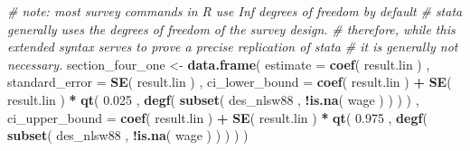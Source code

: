 \documentclass[]{book}
\newenvironment{Shaded}{\begin{snugshade}}{\end{snugshade}}
\newcommand{\CommentTok}[1]{\textcolor[rgb]{0.56,0.35,0.01}{\textit{#1}}}
\newcommand{\DataTypeTok}[1]{\textcolor[rgb]{0.13,0.29,0.53}{#1}}
\newcommand{\FloatTok}[1]{\textcolor[rgb]{0.00,0.00,0.81}{#1}}
\newcommand{\KeywordTok}[1]{\textcolor[rgb]{0.13,0.29,0.53}{\textbf{#1}}}
\newcommand{\NormalTok}[1]{#1}
\newcommand{\OperatorTok}[1]{\textcolor[rgb]{0.81,0.36,0.00}{\textbf{#1}}}
\newcommand{\StringTok}[1]{\textcolor[rgb]{0.31,0.60,0.02}{#1}}
\begin{document}
\begin{Shaded}
\begin{Highlighting}[]
\CommentTok{# note: most survey commands in R use Inf degrees of freedom by default}
\CommentTok{# stata generally uses the degrees of freedom of the survey design.}
\CommentTok{# therefore, while this extended syntax serves to prove a precise replication of stata}
\CommentTok{# it is generally not necessary.}
\NormalTok{section_four_one <-}
\StringTok{    }\KeywordTok{data.frame}\NormalTok{( }
        \DataTypeTok{estimate =} \KeywordTok{coef}\NormalTok{( result.lin ) , }
        \DataTypeTok{standard_error =} \KeywordTok{SE}\NormalTok{( result.lin ) , }
        \DataTypeTok{ci_lower_bound =} 
            \KeywordTok{coef}\NormalTok{( result.lin ) }\OperatorTok{+}\StringTok{ }
\StringTok{            }\KeywordTok{SE}\NormalTok{( result.lin ) }\OperatorTok{*}\StringTok{ }
\StringTok{            }\KeywordTok{qt}\NormalTok{( }\FloatTok{0.025}\NormalTok{ , }\KeywordTok{degf}\NormalTok{( }\KeywordTok{subset}\NormalTok{( des_nlsw88 , }\OperatorTok{!}\KeywordTok{is.na}\NormalTok{( wage ) ) ) ) ,}
        \DataTypeTok{ci_upper_bound =} 
            \KeywordTok{coef}\NormalTok{( result.lin ) }\OperatorTok{+}\StringTok{ }
\StringTok{            }\KeywordTok{SE}\NormalTok{( result.lin ) }\OperatorTok{*}\StringTok{ }
\StringTok{            }\KeywordTok{qt}\NormalTok{( }\FloatTok{0.975}\NormalTok{ , }\KeywordTok{degf}\NormalTok{( }\KeywordTok{subset}\NormalTok{( des_nlsw88 , }\OperatorTok{!}\KeywordTok{is.na}\NormalTok{( wage ) ) ) )}
\NormalTok{    )}
\end{Highlighting}
\end{Shaded}
\end{document}
